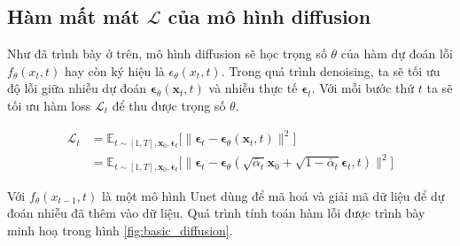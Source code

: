 	
	\subsection{Hàm mất mát $\mathcal{L}$ của mô hình diffusion}
	
	Như đã trình bày ở trên, mô hình diffusion sẽ học trọng số $\theta$ của hàm dự đoán lỗi $f_{\theta} (x_t, t)$ hay còn ký hiệu là  $\epsilon_{\theta} (x_t, t)$. Trong quá trình denoising, ta sẽ tối ưu độ lỗi giữa nhiễu dự đoán $\boldsymbol{\epsilon}_\theta(\mathbf{x}_t, t)$ và nhiễu thực tế $\boldsymbol{\epsilon}_t$. Với mỗi bước thứ $t$ ta sẽ tối ưu hàm loss $\mathcal{L}_{t}$ để thu được trọng số $\theta$.
	
	\begin{equation}
		\label{eq:diffusion_loss}
		\begin{aligned}
			\mathcal{L}_t
			&= \mathbb{E}_{t \sim [1, T], \mathbf{x}_0, \boldsymbol{\epsilon}_t} \Big[\|\boldsymbol{\epsilon}_t - \boldsymbol{\epsilon}_\theta(\mathbf{x}_t, t)\|^2 \Big] \\
			&= \mathbb{E}_{t \sim [1, T], \mathbf{x}_0, \boldsymbol{\epsilon}_t} \Big[\|\boldsymbol{\epsilon}_t - \boldsymbol{\epsilon}_\theta(\sqrt{\bar{\alpha}_t}\mathbf{x}_0 + \sqrt{1 - \bar{\alpha}_t}\boldsymbol{\epsilon}_t, t)\|^2 \Big]
		\end{aligned}
	\end{equation}
	
	
Với $f_{\theta}(x_{t-1}, t)$ là một mô hình Unet dùng để mã hoá và giải mã dữ liệu để dự đoán nhiễu đã thêm vào dữ liệu. Quá trình tính toán hàm lỗi được trình bày minh hoạ trong hình \ref{fig:basic_diffusion}.
	
